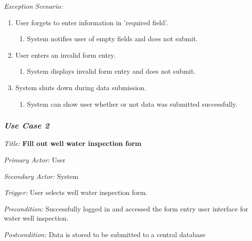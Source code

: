 \documentclass[twoside,letterpaper]{article}
\begin{document}
{\color{black} \textit{Exception Scenario:}}
\begin{enumerate}
\item User forgets to enter information in 'required field'.
\begin{enumerate}
\item System notifies user of empty fields and does not submit.
\end{enumerate}

\item User enters an invalid form entry.
\begin{enumerate}
\item System displays invalid form entry and does not submit.
\end{enumerate}

\item System shuts down during data submission.
\begin{enumerate}
\item System can show user whether or not data was submitted successfully. 
\end{enumerate}
\end{enumerate}

\subsubsection{\textit{Use Case 2}} 

\textit{Title: }{\bfseries\color{black} Fill out well water inspection form}

{\color{black} \textit{Primary Actor:} User}

{\color{black} \textit{Secondary Actor:} System}

{\color{black} \textit{Trigger:} User selects well water inspection form.}

{\color{black} \textit{Precondition:} Successfully logged in and accessed the form entry user interface for water well inspection.}

{\color{black} \textit{Postcondition:}  Data is stored to be submitted to a central database}
\newline
\end{document}
